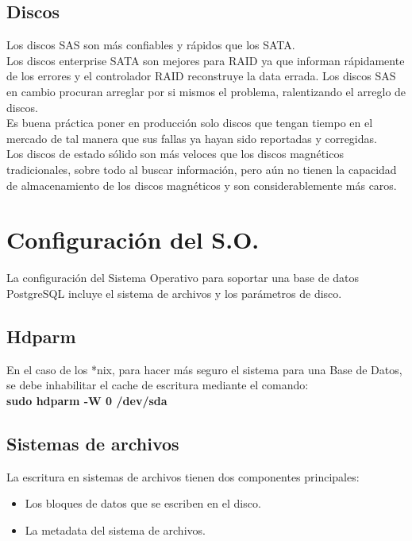 \subsection{Discos}

Los discos SAS son más confiables y rápidos que los SATA.\\

Los discos enterprise SATA son mejores para RAID ya que informan rápidamente de los errores y el controlador RAID reconstruye la data errada. Los discos SAS en cambio procuran arreglar por si mismos el problema, ralentizando el arreglo de discos.\\

Es buena práctica poner en producción solo discos que tengan tiempo en el mercado de tal manera que sus fallas ya hayan sido reportadas y corregidas.\\

Los discos de estado sólido son más veloces que los discos magnéticos tradicionales, sobre todo al buscar información, pero aún no tienen la capacidad de almacenamiento de los discos magnéticos y son considerablemente más caros.

\section{Configuración del S.O.}

La configuración del Sistema Operativo para soportar una base de datos PostgreSQL incluye el sistema de archivos y los parámetros de disco.

\subsection{Hdparm}

En el caso de los *nix, para hacer más seguro el sistema para una Base de Datos, se debe inhabilitar el cache de escritura mediante el comando:\\

\textbf{sudo hdparm -W 0 /dev/sda}

\subsection{Sistemas de archivos}

La escritura en sistemas de archivos tienen dos componentes principales:

\begin{itemize}
\item Los bloques de datos que se escriben en el disco.
\item La metadata del sistema de archivos.
\end{itemize}

